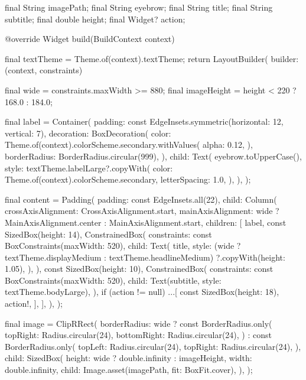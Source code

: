 \documentclass[11pt,a4paper]{article}
\begin{document}
\begin{codeblock}
{  final String imagePath;
  final String eyebrow;
  final String title;
  final String subtitle;
  final double height;
  final Widget? action;

  @override
  Widget build(BuildContext context) {
    final textTheme = Theme.of(context).textTheme;
    return LayoutBuilder(
      builder: (context, constraints) {
        final wide = constraints.maxWidth >= 880;
        final imageHeight = height < 220 ? 168.0 : 184.0;

        final label = Container(
          padding: const EdgeInsets.symmetric(horizontal: 12, vertical: 7),
          decoration: BoxDecoration(
            color: Theme.of(context).colorScheme.secondary.withValues(
                  alpha: 0.12,
                ),
            borderRadius: BorderRadius.circular(999),
          ),
          child: Text(
            eyebrow.toUpperCase(),
            style: textTheme.labelLarge?.copyWith(
              color: Theme.of(context).colorScheme.secondary,
              letterSpacing: 1.0,
            ),
          ),
        );

        final content = Padding(
          padding: const EdgeInsets.all(22),
          child: Column(
            crossAxisAlignment: CrossAxisAlignment.start,
            mainAxisAlignment:
                wide ? MainAxisAlignment.center : MainAxisAlignment.start,
            children: [
              label,
              const SizedBox(height: 14),
              ConstrainedBox(
                constraints: const BoxConstraints(maxWidth: 520),
                child: Text(
                  title,
                  style: (wide
                          ? textTheme.displayMedium
                          : textTheme.headlineMedium)
                      ?.copyWith(height: 1.05),
                ),
              ),
              const SizedBox(height: 10),
              ConstrainedBox(
                constraints: const BoxConstraints(maxWidth: 520),
                child: Text(subtitle, style: textTheme.bodyLarge),
              ),
              if (action != null) ...[
                const SizedBox(height: 18),
                action!,
              ],
            ],
          ),
        );

        final image = ClipRRect(
          borderRadius: wide
              ? const BorderRadius.only(
                  topRight: Radius.circular(24),
                  bottomRight: Radius.circular(24),
                )
              : const BorderRadius.only(
                  topLeft: Radius.circular(24),
                  topRight: Radius.circular(24),
                ),
          child: SizedBox(
            height: wide ? double.infinity : imageHeight,
            width: double.infinity,
            child: Image.asset(imagePath, fit: BoxFit.cover),
          ),
        );

}}}
\end{codeblock}
\end{document}
